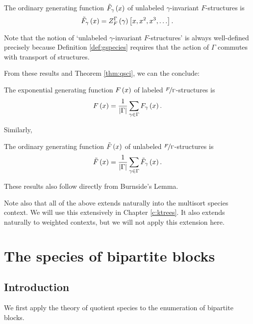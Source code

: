 \documentclass[sectionflow,singlespace,twoside,boldmathhdr,draft]{brandiss} %
\numberwithin{section}{chapter}
\numberwithin{figure}{chapter}
\begin{document}
\begin{theorem}
  \label{thm:gciogf}
  The ordinary generating function $\tilde{F}_{\gamma} \left( {x} \right)$ of unlabeled $\gamma$-invariant $F$-structures is
  \begin{equation}
    \label{eq:gciogf}
    \tilde{F}_{\gamma} \left( {x} \right) =  Z_{F}^{{\Gamma} {}}  \left( {\gamma} \right) \left[ {x, x^{2}, x^{3}, \dots} \right].
  \end{equation}
\end{theorem}
Note that the notion of `unlabeled $\gamma$-invariant $F$-structures' is always well-defined precisely because Definition \ref{def:gspecies} requires that the action of $\Gamma$ commutes with transport of structures.

From these results and Theorem \ref{thm:qsci}, we can the conclude:
\begin{theorem}
  \label{qgciegf}
  The exponential generating function $F \left( {x} \right)$ of labeled $\nicefrac{F}{\Gamma}$-structures is
  \begin{equation}
    \label{eq:qgciegf}
    F \left( {x} \right) = \frac{1}{\left\vert {\Gamma} \right\vert} \sum_{\gamma \in \Gamma} F_{\gamma} \left( {x} \right).
  \end{equation}
\end{theorem}

Similarly,
\begin{theorem}
  \label{qgciogf}
  The ordinary generating function $\tilde{F} \left( {x} \right)$ of unlabeled $\nicefrac{F}{\Gamma}$-structures is
  \begin{equation}
    \label{eq:qgcogf}
    \tilde{F} \left( {x} \right) = \frac{1}{\left\vert {\Gamma} \right\vert} \sum_{\gamma \in \Gamma} \tilde{F}_{\gamma} \left( {x} \right).
  \end{equation}
\end{theorem}

These results also follow directly from Burnside's Lemma.

Note also that all of the above extends naturally into the multisort species context.
We will use this extensively in Chapter \ref{c:ktrees}.
It also extends naturally to weighted contexts, but we will not apply this extension here.

\chapter{The species of bipartite blocks}\label{c:bpblocks}
\section{Introduction}\label{s:bpintro}
We first apply the theory of quotient species to the enumeration of bipartite blocks.
\end{document}
